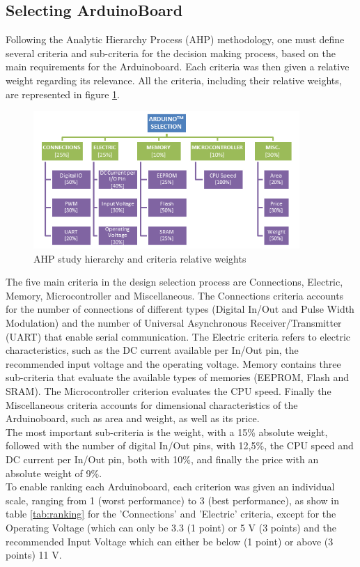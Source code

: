 \subsection{Selecting Arduino\texttrademark Board}
\label{subsection:arduinoAHP}
Following the Analytic Hierarchy Process (AHP) methodology, one must define several criteria and sub-criteria for the decision making process, based on the main requirements for the Arduino\texttrademark board. Each criteria was then given a relative weight regarding its relevance. All the criteria, including their relative weights, are represented in figure \ref{fig:arduinoahpperc}.\\
\begin{figure}[!htb]
  \centering
  \includegraphics[width=0.90\textwidth]{Figures/arduinoahpperc.png}
  \caption[AHP study hierarchy and criteria relative weights]{AHP study hierarchy and criteria relative weights}
  \label{fig:arduinoahpperc}
\end{figure}
The five main criteria in the design selection process are Connections, Electric, Memory, Microcontroller and Miscellaneous. The Connections criteria accounts for the number of connections of different types (Digital In/Out and Pulse Width Modulation) and the number of Universal Asynchronous Receiver/Transmitter (UART) that enable serial communication. The Electric criteria refers to electric characteristics, such as the DC current available per In/Out pin, the recommended input voltage and the operating voltage. Memory contains three sub-criteria that evaluate the available types of memories (EEPROM, Flash and SRAM). The Microcontroller criterion evaluates the CPU speed. Finally the Miscellaneous criteria accounts for dimensional characteristics of the Arduino\texttrademark board, such as area and weight, as well as its price.\\
The most important sub-criteria is the weight, with a 15\% absolute weight, followed with the number of digital In/Out pins, with 12,5\%, the CPU speed and DC current per In/Out pin, both with 10\%, and finally the price with an absolute weight of 9\%.\\
To enable ranking each Arduino\texttrademark board, each criterion was given an individual scale, ranging from 1 (worst performance) to 3 (best performance), as show in table \ref{tab:ranking} for the 'Connections' and 'Electric' criteria, except for the Operating Voltage (which can only be 3.3 (1 point) or 5 V (3 points) and the recommended Input Voltage which can either be below (1 point) or above (3 points) 11 V.

